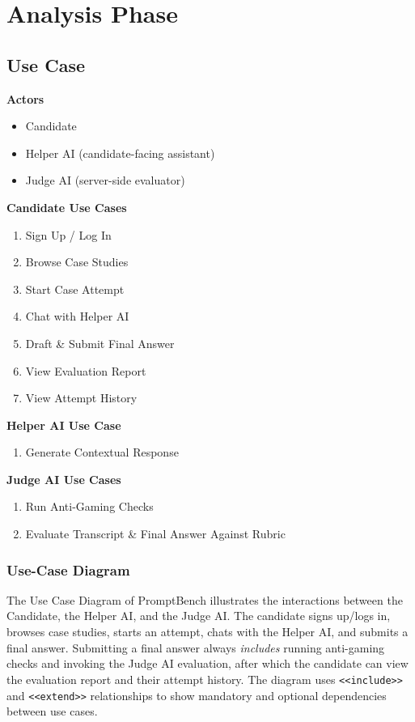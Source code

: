 \documentclass[12pt,a4paper]{report}
\begin{document}
\chapter{Analysis Phase}

\section{Use Case}

\textbf{Actors}
\begin{itemize}[nosep]
    \item Candidate
    \item Helper AI (candidate-facing assistant)
    \item Judge AI (server-side evaluator)
\end{itemize}

\textbf{Candidate Use Cases}
\begin{enumerate}[nosep]
    \item Sign Up / Log In
    \item Browse Case Studies
    \item Start Case Attempt
    \item Chat with Helper AI
    \item Draft \& Submit Final Answer
    \item View Evaluation Report
    \item View Attempt History
\end{enumerate}

\textbf{Helper AI Use Case}
\begin{enumerate}[nosep,start=8]
    \item Generate Contextual Response
\end{enumerate}

\textbf{Judge AI Use Cases}
\begin{enumerate}[nosep,start=9]
    \item Run Anti-Gaming Checks
    \item Evaluate Transcript \& Final Answer Against Rubric
\end{enumerate}

\subsection{Use-Case Diagram}

The Use Case Diagram of PromptBench illustrates the interactions between the Candidate, the
Helper AI, and the Judge AI. The candidate signs up/logs in, browses case studies, starts an
attempt, chats with the Helper AI, and submits a final answer. Submitting a final answer always
\emph{includes} running anti-gaming checks and invoking the Judge AI evaluation, after which the
candidate can view the evaluation report and their attempt history. The diagram uses
\texttt{<<include>>} and \texttt{<<extend>>} relationships to show mandatory and optional
dependencies between use cases.
\end{document}
